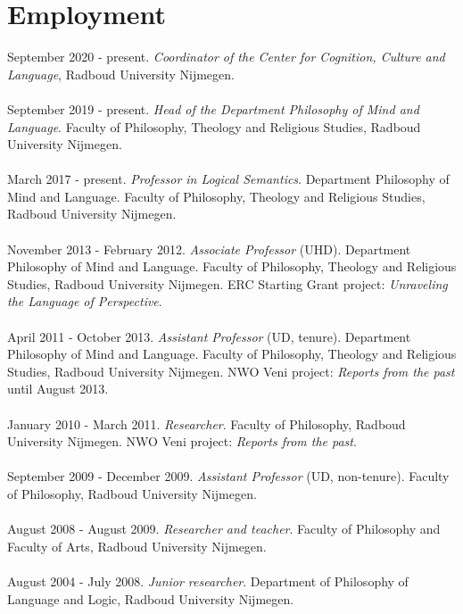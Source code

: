\documentclass[a4paper,11pt]{article}
\begin{document}
\section*{Employment}

September 2020 - present. \emph{Coordinator of the Center for Cognition, Culture and Language}, Radboud University Nijmegen.\\\\
September 2019 - present. \emph{Head of the Department Philosophy of Mind and Language}. Faculty of Philosophy, Theology and Religious Studies, Radboud University Nijmegen.\\\\
March 2017 - present. \emph{Professor in Logical Semantics}.  Department Philosophy of Mind and Language. Faculty of Philosophy, Theology and Religious Studies, Radboud University Nijmegen.\\\\
November 2013 - February 2012. \emph{Associate Professor} (UHD).  Department Philosophy of Mind and Language. Faculty of Philosophy, Theology and Religious Studies, Radboud University Nijmegen. ERC Starting Grant project: \emph{Unraveling the Language of Perspective}.\\\\
April 2011 - October 2013. \emph{Assistant Professor} (UD, tenure). Department Philosophy of Mind and Language. Faculty of Philosophy, Theology and Religious Studies, Radboud University Nijmegen.  NWO Veni project: \emph{Reports from the past} until August 2013.\\\\
January 2010 - March 2011.  \emph{Researcher}. Faculty of Philosophy, Radboud University Nijmegen.
NWO Veni project: \emph{Reports from the past}.\\\\
September 2009 - December 2009. \emph{Assistant Professor} (UD, non-tenure). Faculty of Philosophy, Radboud University Nijmegen.\\\\ 
August 2008 - August 2009. \emph{Researcher and teacher}. Faculty of Philosophy and Faculty of Arts, Radboud University Nijmegen.\\\\
August 2004 - July 2008. \emph{Junior researcher}. Department of
Philosophy of Language and Logic, Radboud University Nijmegen.\\\\
\end{document}
